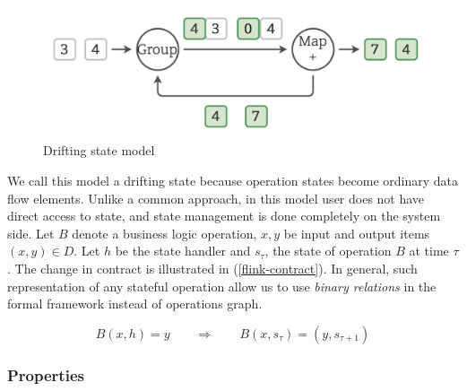 \begin{figure}[htbp]
  \centering
  \includegraphics[width=\columnwidth]{pics/classical-drifting2}
  \caption{Drifting state model}
  \label {classical-drifting2}
\end{figure}

We call this model a drifting state because operation states become ordinary data flow elements. Unlike a common approach, in this model user does not have direct access to state, and state management is done completely on the system side. Let $B$ denote a business logic operation, $x, y$ be input and output items $(x,y)\in D$. Let $h$ be the state handler and $s_\tau$, the state of operation $B$ at time $\tau$. The change in contract is illustrated in (\ref{flink-contract}). In general, such representation of any stateful operation allow us to use {\em binary relations} in the formal framework instead of operations graph.

\begin{equation}
  \label{flink-contract}
  B(x, h) = y \qquad\Longrightarrow\qquad B(x, s_{\tau}) = (y, s_{\tau+1}) 
\end{equation}

\subsubsection{Properties}

